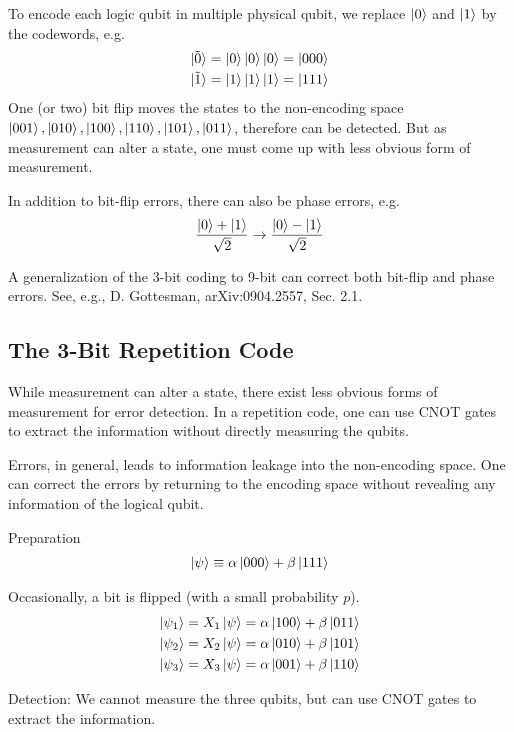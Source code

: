 To encode each logic qubit in multiple physical qubit, we replace $\ket{0}$ and $\ket{1}$ by the codewords, e.g.
\begin{align*}
    \ket{\tilde{0}}=\ket{0}\ket{0}\ket{0}=\ket{000}\\
    \ket{\tilde{1}}=\ket{1}\ket{1}\ket{1}=\ket{111}
\end{align*}
One (or two) bit ﬂip moves the states to the non-encoding space $\ket{001}, \ket{010}, \ket{100}, \ket{110}, \ket{101}, \ket{011}$, therefore can be detected. But as measurement can alter a state, one must come up with less obvious form of measurement.

In addition to bit-ﬂip errors, there can also be phase errors,
e.g.
\begin{align*}
    \frac{\ket{0}+\ket{1}}{\sqrt{2}}\rightarrow\frac{\ket{0}-\ket{1}}{\sqrt{2}}
\end{align*}

A generalization of the 3-bit coding to 9-bit can correct both bit-ﬂip and phase errors. See, e.g., D. Gottesman, arXiv:0904.2557, Sec. 2.1.

\subsection{The 3-Bit Repetition Code}
While measurement can alter a state, there exist less obvious forms of measurement for error detection. In a repetition code, one can use CNOT gates to extract the information without directly measuring the qubits.

Errors, in general, leads to information leakage into the non-encoding space. One can correct the errors by returning to the encoding space without revealing any information of the logical qubit.

Preparation
\begin{align*}
    \ket{\psi}\equiv \alpha\ket{000}+\beta\ket{111}
\end{align*}

Occasionally, a bit is flipped (with a small probability $p$).
\begin{align*}
    \ket{\psi_1}=X_1\ket{\psi}=\alpha\ket{100}+\beta\ket{011}\\
    \ket{\psi_2}=X_2\ket{\psi}=\alpha\ket{010}+\beta\ket{101}\\
    \ket{\psi_3}=X_3\ket{\psi}=\alpha\ket{001}+\beta\ket{110}
\end{align*}

Detection: We cannot measure the three qubits, but can use CNOT gates to extract the information.


